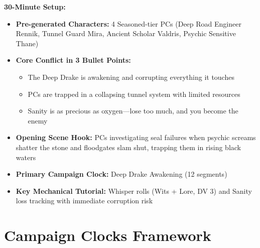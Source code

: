\documentclass[11pt]{article}
\begin{document}
\textbf{30-Minute Setup:}
\begin{itemize}
\item \textbf{Pre-generated Characters:} 4 Seasoned-tier PCs (Deep Road Engineer Rennik, Tunnel Guard Mira, Ancient Scholar Valdris, Psychic Sensitive Thane)
\item \textbf{Core Conflict in 3 Bullet Points:}
  \begin{itemize}
  \item The Deep Drake is awakening and corrupting everything it touches
  \item PCs are trapped in a collapsing tunnel system with limited resources
  \item Sanity is as precious as oxygen—lose too much, and you become the enemy
  \end{itemize}
\item \textbf{Opening Scene Hook:} PCs investigating seal failures when psychic screams shatter the stone and floodgates slam shut, trapping them in rising black waters
\item \textbf{Primary Campaign Clock:} Deep Drake Awakening (12 segments)
\item \textbf{Key Mechanical Tutorial:} Whisper rolls (Wits + Lore, DV 3) and Sanity loss tracking with immediate corruption risk
\end{itemize}

\section{Campaign Clocks Framework}
\end{document}
